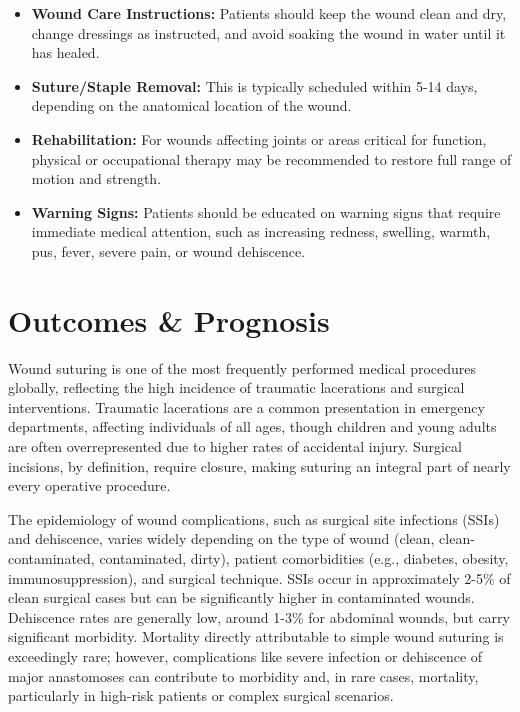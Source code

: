 \begin{itemize}
  \item \textbf{Wound Care Instructions:} Patients should keep the wound clean and dry, change dressings as instructed, and avoid soaking the wound in water until it has healed.
  
  \item \textbf{Suture/Staple Removal:} This is typically scheduled within 5-14 days, depending on the anatomical location of the wound.
  
  \item \textbf{Rehabilitation:} For wounds affecting joints or areas critical for function, physical or occupational therapy may be recommended to restore full range of motion and strength.
  
  \item \textbf{Warning Signs:} Patients should be educated on warning signs that require immediate medical attention, such as increasing redness, swelling, warmth, pus, fever, severe pain, or wound dehiscence.
\end{itemize}

\section*{Outcomes \& Prognosis}
Wound suturing is one of the most frequently performed medical procedures globally, reflecting the high incidence of traumatic lacerations and surgical interventions. Traumatic lacerations are a common presentation in emergency departments, affecting individuals of all ages, though children and young adults are often overrepresented due to higher rates of accidental injury. Surgical incisions, by definition, require closure, making suturing an integral part of nearly every operative procedure. 

The epidemiology of wound complications, such as surgical site infections (SSIs) and dehiscence, varies widely depending on the type of wound (clean, clean-contaminated, contaminated, dirty), patient comorbidities (e.g., diabetes, obesity, immunosuppression), and surgical technique. SSIs occur in approximately 2-5\% of clean surgical cases but can be significantly higher in contaminated wounds. Dehiscence rates are generally low, around 1-3\% for abdominal wounds, but carry significant morbidity. Mortality directly attributable to simple wound suturing is exceedingly rare; however, complications like severe infection or dehiscence of major anastomoses can contribute to morbidity and, in rare cases, mortality, particularly in high-risk patients or complex surgical scenarios.

